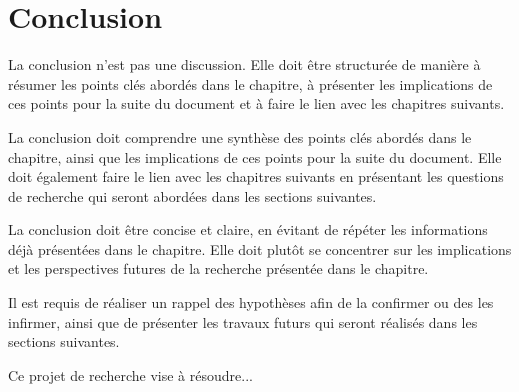 \section*{Conclusion}
\label{sec:sec_examples_chap_1}

La conclusion n'est pas une discussion. Elle doit être structurée de manière à résumer les points clés abordés dans le chapitre, à présenter les implications de ces points pour la suite du document et à faire le lien avec les chapitres suivants.

La conclusion doit comprendre une synthèse des points clés abordés dans le chapitre, ainsi que les implications de ces points pour la suite du document. Elle doit également faire le lien avec les chapitres suivants en présentant les questions de recherche qui seront abordées dans les sections suivantes.

La conclusion doit être concise et claire, en évitant de répéter les informations déjà présentées dans le chapitre. Elle doit plutôt se concentrer sur les implications et les perspectives futures de la recherche présentée dans le chapitre.

Il est requis de réaliser un rappel des hypothèses afin de la confirmer ou des les infirmer, ainsi que de présenter les travaux futurs qui seront réalisés dans les sections suivantes.

Ce projet de recherche vise à résoudre...

\newpage
